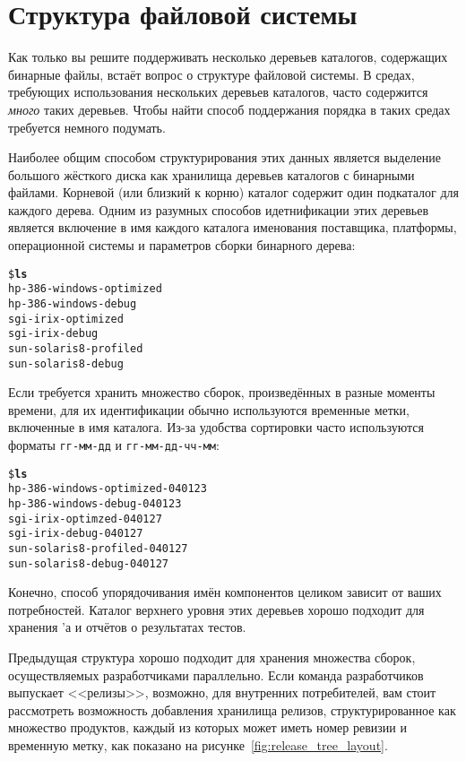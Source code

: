 \section{Структура файловой системы}
\label{sec:filesystem_layout}

Как только вы решите поддерживать несколько деревьев каталогов,
содержащих бинарные файлы, встаёт вопрос о структуре файловой системы.
В средах, требующих использования нескольких деревьев каталогов, часто
содержится \emph{много} таких деревьев. Чтобы найти способ
поддержания порядка в таких средах требуется немного подумать.

Наиболее общим способом структурирования этих данных является
выделение большого жёсткого диска как хранилища деревьев каталогов с
бинарными файлами. Корневой (или близкий к корню) каталог содержит
один подкаталог для каждого дерева. Одним из разумных способов
идетнификации этих деревьев является включение в имя каждого каталога
именования поставщика, платформы, операционной системы и параметров
сборки бинарного дерева:

{\footnotesize
\begin{alltt}
\$ \textbf{ls}
hp-386-windows-optimized
hp-386-windows-debug
sgi-irix-optimized
sgi-irix-debug
sun-solaris8-profiled
sun-solaris8-debug
\end{alltt}
}

Если требуется хранить множество сборок, произведённых в разные
моменты времени, для их идентификации обычно используются временные
метки, включенные в имя каталога. Из-за удобства сортировки часто
используются форматы \texttt{гг-мм-дд} и \texttt{гг-мм-дд-чч-мм}:

{\footnotesize
\begin{alltt}
\$ \textbf{ls}
hp-386-windows-optimized-040123
hp-386-windows-debug-040123
sgi-irix-optimzed-040127
sgi-irix-debug-040127
sun-solaris8-profiled-040127
sun-solaris8-debug-040127
\end{alltt}
}

Конечно, способ упорядочивания имён компонентов целиком зависит от
ваших потребностей. Каталог верхнего уровня этих деревьев хорошо
подходит для хранения \Makefile{}'а и отчётов о результатах тестов.

Предыдущая структура хорошо подходит для хранения множества сборок,
осуществляемых разработчиками параллельно. Если команда разработчиков
выпускает <<релизы>>, возможно, для внутренних потребителей, вам стоит
рассмотреть возможность добавления хранилища релизов,
структурированное как множество продуктов, каждый из которых может
иметь номер ревизии и временную метку, как показано на
рисунке~\ref{fig:release_tree_layout}.


